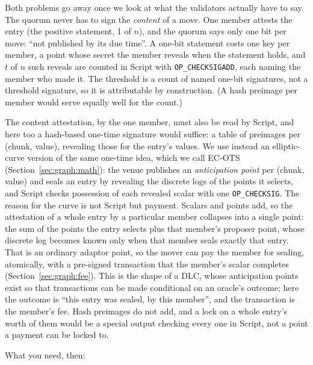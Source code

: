 \documentclass[11pt]{article}
\begin{document}
Both problems go away once we look at what the validators actually have to say. The quorum never has to sign the \emph{content} of a move. One member attests the entry (the positive statement, 1 of $n$), and the quorum says only one bit per move: ``not published by its due time''. A one-bit statement costs one key per member, a point whose secret the member reveals when the statement holds, and $t$ of $n$ such reveals are counted in Script with \texttt{OP\_CHECKSIGADD}, each naming the member who made it. The threshold is a count of named one-bit signatures, not a threshold signature, so it is attributable by construction. (A hash preimage per member would serve equally well for the count.)

The content attestation, by the one member, must also be read by Script, and here too a hash-based one-time signature would suffice: a table of preimages per (chunk, value), revealing those for the entry's values. We use instead an elliptic-curve version of the same one-time idea, which we call EC-OTS (Section~\ref{sec:graph:math}): the venue publishes an \emph{anticipation point} per (chunk, value) and seals an entry by revealing the discrete logs of the points it selects, and Script checks possession of each revealed scalar with one \texttt{OP\_CHECKSIG}. The reason for the curve is not Script but payment. Scalars and points add, so the attestation of a whole entry by a particular member collapses into a single point: the sum of the points the entry selects plus that member's proposer point, whose discrete log becomes known only when that member seals exactly that entry. That is an ordinary adaptor point, so the mover can pay the member for sealing, atomically, with a pre-signed transaction that the member's scalar completes (Section~\ref{sec:graph:fee}). This is the shape of a DLC, whose anticipation points exist so that transactions can be made conditional on an oracle's outcome; here the outcome is ``this entry was sealed, by this member'', and the transaction is the member's fee. Hash preimages do not add, and a lock on a whole entry's worth of them would be a special output checking every one in Script, not a point a payment can be locked to.

What you need, then:
\end{document}
